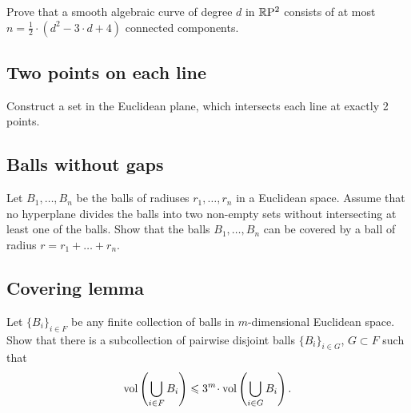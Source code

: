 \begin{pr}
Prove that a smooth algebraic curve of degree $d$ in $\mathbb{R}\mathrm{P}^2$ consists of at most $n=\tfrac12\cdot(d^2-3\cdot d+4)$ connected components.
\end{pr}

\subsection*{Two points on each line}\label{2pts-on-line}

\begin{pr}
Construct a set in the Euclidean plane, 
which intersects each line at exactly 2 points. 
\end{pr}

\subsection*{Balls without gaps}
\label{Balls without gaps}

\begin{pr}
Let $B_1,\dots,B_n$ be the balls  
of radiuses $r_1,\dots,r_n$ 
in a Euclidean space.
Assume that no hyperplane divides the balls into two
non-empty sets without intersecting at least one of the balls. 
Show that the balls
$B_1,\dots,B_n$ can be covered by a ball of radius
$r=r_1+\dots+r_n$.

\end{pr}

\subsection*{Covering lemma}

\begin{pr}
Let $\{B_i\}_{i\in F}$ be any finite collection of  balls in $m$-dimensional Euclidean space. 
Show that there is a subcollection of pairwise disjoint balls $\{B_i\}_{i\in G}$, $G\subset F$
such that
\[\vol \left(\bigcup_{i\in F}B_i\right)\le 3^m\cdot \vol \left(\bigcup_{i\in G}B_i\right).\]
\end{pr}



